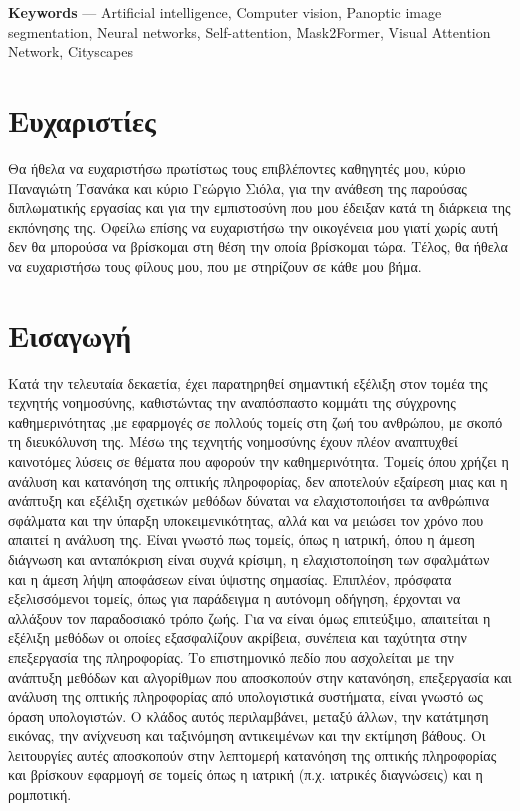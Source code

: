 \documentclass[12pt]{article}
\makeatletter
\numberwithin{equation}{section}
\newcommand{\ListOfFiguresEnglish}{%
  \begingroup
    \addto\captionsenglish{\renewcommand{\listfigurename}{Κατάλογος Σχημάτων}}%
    \let\orig@select@language\select@language
    \def\select@language##1{\orig@select@language{english}}%
    \listoffigures
  \endgroup
}
\renewcommand{\listfigurename}{Κατάλογος Σχημάτων}%
\makeatother
\begin{document}
\noindent\textbf{Keywords} — Artificial intelligence, Computer vision, Panoptic image segmentation, Neural networks,
Self-attention, Mask2Former, Visual Attention Network, Cityscapes



\newpage
\mbox{}
\newpage

\section*{Ευχαριστίες}

Θα ήθελα να ευχαριστήσω πρωτίστως τους επιβλέποντες καθηγητές μου, κύριο Παναγιώτη Τσανάκα και κύριο Γεώργιο Σιόλα, για την ανάθεση της παρούσας διπλωματικής εργασίας και για την εμπιστοσύνη που μου έδειξαν κατά τη διάρκεια της εκπόνησης της. Οφείλω επίσης να ευχαριστήσω την οικογένεια μου γιατί χωρίς αυτή δεν θα μπορούσα να βρίσκομαι στη θέση την οποία βρίσκομαι τώρα. Τέλος, θα ήθελα να ευχαριστήσω τους φίλους μου, που με στηρίζουν σε κάθε μου βήμα.


\newpage
\mbox{}
\newpage

\tableofcontents

\newpage
\ListOfFiguresEnglish

\newpage
\listoftables

\newpage
{}

\section*{Εισαγωγή}
{}

Κατά την τελευταία δεκαετία, έχει παρατηρηθεί σημαντική εξέλιξη στον τομέα της τεχνητής νοημοσύνης, καθιστώντας την αναπόσπαστο κομμάτι της σύγχρονης καθημερινότητας ,με εφαρμογές σε πολλούς τομείς στη ζωή του ανθρώπου, με σκοπό τη διευκόλυνση της. Μέσω της τεχνητής νοημοσύνης έχουν πλέον αναπτυχθεί καινοτόμες λύσεις σε θέματα που αφορούν την καθημερινότητα. Τομείς όπου χρήζει η ανάλυση και κατανόηση της οπτικής πληροφορίας, δεν αποτελούν εξαίρεση μιας και η ανάπτυξη και εξέλιξη σχετικών μεθόδων δύναται να ελαχιστοποιήσει τα ανθρώπινα σφάλματα και την ύπαρξη υποκειμενικότητας, αλλά και να μειώσει τον χρόνο που απαιτεί η ανάλυση της. Είναι γνωστό πως τομείς, όπως η ιατρική, όπου η άμεση διάγνωση και ανταπόκριση είναι συχνά κρίσιμη, η ελαχιστοποίηση των σφαλμάτων και η άμεση λήψη αποφάσεων είναι ύψιστης σημασίας. Επιπλέον, πρόσφατα εξελισσόμενοι τομείς, όπως για παράδειγμα η αυτόνομη οδήγηση, έρχονται να αλλάξουν τον παραδοσιακό τρόπο ζωής. Για να είναι όμως επιτεύξιμο, απαιτείται η εξέλιξη μεθόδων οι οποίες εξασφαλίζουν ακρίβεια, συνέπεια και ταχύτητα στην επεξεργασία της πληροφορίας. Το επιστημονικό πεδίο που ασχολείται με την ανάπτυξη μεθόδων και αλγορίθμων που αποσκοπούν στην κατανόηση, επεξεργασία και ανάλυση της οπτικής πληροφορίας από υπολογιστικά συστήματα, είναι γνωστό ως όραση υπολογιστών. Ο κλάδος αυτός περιλαμβάνει, μεταξύ άλλων, την κατάτμηση εικόνας, την ανίχνευση και ταξινόμηση αντικειμένων και την εκτίμηση βάθους. Οι λειτουργίες αυτές αποσκοπούν στην λεπτομερή κατανόηση της οπτικής πληροφορίας και βρίσκουν εφαρμογή σε τομείς όπως η ιατρική (π.χ. ιατρικές διαγνώσεις) και η ρομποτική.\\
\end{document}
